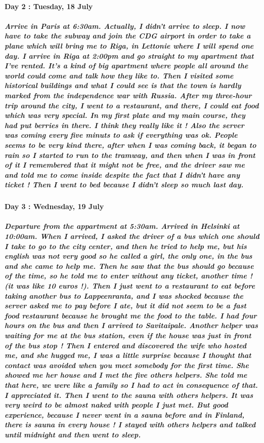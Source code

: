 \documentclass[a4paper,12pt]{report} %
\begin{document}
\paragraph{Day 2 : Tuesday, 18 July}
\subparagraph{Arrive in Paris at 6:30am. Actually, I didn't arrive to sleep. I now have to take the subway and join the CDG airport in order to take a plane which will bring me to Riga, in Lettonie where I will spend one day. I arrive in Riga at 2:00pm and go straight to my apartment that I've rented. It's a kind of big apartment where people all around the world could come and talk how they like to. Then I visited some historical buildings and what I could see is that the town is hardly marked from the independence war with Russia. After my three-hour trip around the city, I went to a restaurant, and there, I could eat food which was very special. In my first plate and my main course, they had put berries in there. I think they really like it ! Also the server was coming every five minuts to ask if everything was ok. People seems to be very kind there, after when I was coming back, it began to rain so I started to run to the tramway, and then when I was in front of it I remembered that it might not be free, and the driver saw me and told me to come inside despite the fact that I didn't have any ticket ! Then I went to bed because I didn't sleep so much last day.}

\paragraph{Day 3 : Wednesday, 19 July}
\subparagraph{Departure from the appartment at 5:30am. Arrived in Helsinki at 10:00am. When I arrived, I asked the driver of a bus which one should I take to go to the city center, and then he tried to help me, but his english was not very good so he called a girl, the only one, in the bus and she came to help me. Then he saw that the bus should go because of the time, so he told me to enter without any ticket, another time ! (it was like 10 euros !). Then I just went to a restaurant to eat before taking another bus to Lappeenranta, and I was shocked because the server asked me to pay before I ate, but it did not seem to be a fast food restaurant because he brought me the food to the table. I had four hours on the bus and then I arrived to Savitaipale. Another helper was waiting for me at the bus station, even if the house was just in front of the bus stop ! Then I entered and discovered the wife who hosted me, and she hugged me, I was a little surprise because I thought that contact was avoided when you meet somebody for the first time. She showed me her house and I met the five others helpers. She told me that here, we were like a family so I had to act in consequence of that. I appreciated it. Then I went to the sauna with others helpers. It was very weird to be almost naked with people I just met. But good experience, because I never went in a sauna before and in Finland, there is sauna in every house ! I stayed with others helpers and talked until midnight and then went to sleep.}
\end{document}
